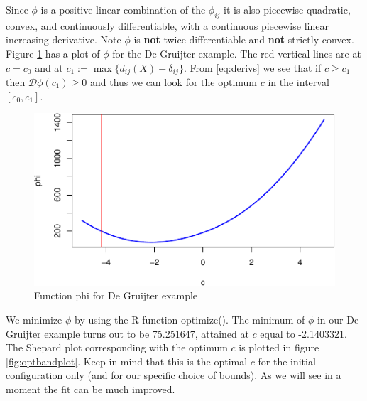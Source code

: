 \documentclass[
  12pt,
]{article}
\begin{document}
Since \(\phi\) is a positive linear combination of the \(\phi_{ij}\) it is also piecewise quadratic, convex, and continuously differentiable,
with a continuous piecewise linear increasing derivative. Note \(\phi\) is \textbf{not} twice-differentiable
and \textbf{not} strictly convex. Figure \ref{fig:morefunc} has a plot of \(\phi\) for the De Gruijter
example. The red vertical lines are at \(c=c_0\) and at \(c_1:=\max\{d_{ij}(X)-\delta_{ij}^-\}\). From \eqref{eq:derivs} we see that if \(c\geq c_1\)
then \(\mathcal{D}\phi(c_1)\geq 0\) and thus we can look for the optimum \(c\) in the interval
\([c_0,c_1]\).

\begin{figure}
\centering
\includegraphics{smacofAC_files/figure-latex/morefunc-1.pdf}
\caption{\label{fig:morefunc}Function phi for De Gruijter example}
\end{figure}

We minimize \(\phi\) by using the R function optimize(). The minimum of \(\phi\) in our De Gruijter example turns out to be 75.251647, attained at \(c\) equal to
-2.1403321. The Shepard plot corresponding with the optimum \(c\) is plotted in figure \ref{fig:optbandplot}. Keep in mind that this is the optimal \(c\) for the initial
configuration only (and for our specific choice of bounds). As we will see in a moment the
fit can be much improved.
\end{document}
